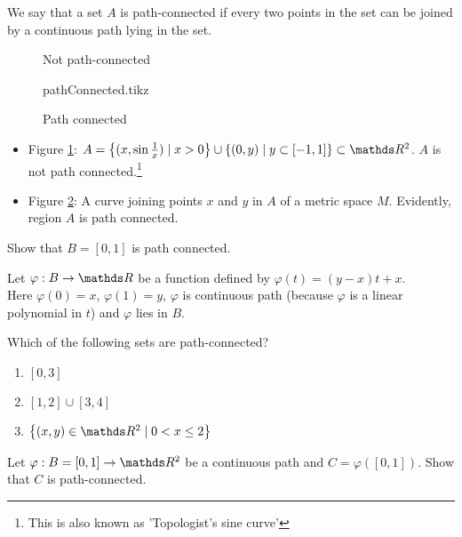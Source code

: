 \documentclass[../main-sheet.tex]{subfiles}
\begin{document}
We say that a set $ A $ is path-connected if every two points in the set can be joined by a continuous path lying in the set.
\begin{figure}[H]
    \centering
    \caption{Not path-connected}
    \label{fig:path1}
\end{figure}
\begin{figure}[H]
    \centering
    {pathConnected.tikz}
    \caption{Path connected}
    \label{fig:path2}
\end{figure}
\begin{itemize}
    \item Figure \ref{fig:path1}: $ A=\set{(x,\sin\frac{1}{x})\mid x>0} \cup \set{(0,y)\mid y\subset [-1,1]}\subset \R^2$. $ A $ is not path connected.\footnote{This is also known as 'Topologist's sine curve'}
    \item Figure \ref{fig:path2}: A curve joining points $ x $ and $ y $ in $ A $ of a metric space $ M $. Evidently, region $ A $ is path connected. 
\end{itemize}
\begin{prob}
    Show that $ B=[0,1] $ is path connected.
\end{prob}
\begin{soln}
    Let $ \varphi: B\to\R $ be a function defined by $ \varphi(t)=(y-x)t+x $.\\
    Here $ \varphi(0)=x $, $ \varphi(1)=y $, $ \varphi $ is continuous path (because $ \varphi $ is a linear polynomial in $ t $) and $ \varphi $ lies in $ B $.
\end{soln}
\begin{prob}
    Which of the following sets are path-connected?
    \begin{enumerate}[label=(\roman*)]
        \item $ [0,3] $
        \item $ [1,2] \cup [3,4 ]$
        \item $ \set{(x,y)\in\R^2\mid0<x \leq2} $
    \end{enumerate}
\end{prob}
\begin{prob}
    Let $ \varphi: B=[0,1]\to \R^2 $ be a continuous path and $ C=\varphi([0,1]) $. Show that $ C $ is path-connected.
\end{prob}
\end{document}
